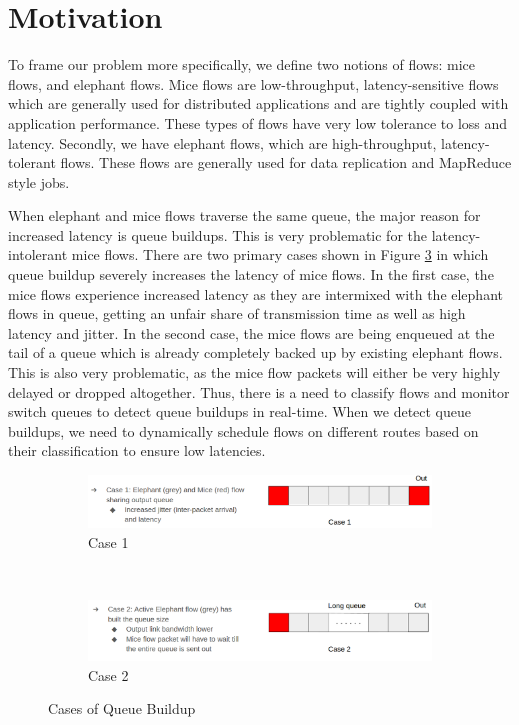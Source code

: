 \section{Motivation}
To frame our problem more specifically, we define two notions of flows: mice flows, and elephant flows. Mice flows are low-throughput, latency-sensitive flows which are generally used for distributed applications and are tightly coupled with application performance. These types of flows have very low tolerance to loss and latency. Secondly, we have elephant flows, which are high-throughput, latency-tolerant flows. These flows are generally used for data replication and MapReduce style jobs. 

When elephant and mice flows traverse the same queue, the major reason for increased latency is queue buildups. This is very problematic for the latency-intolerant mice flows. There are two primary cases shown in Figure \ref{fig:cases} in which queue buildup severely increases the latency of mice flows. In the first case, the mice flows experience increased latency as they are intermixed with the elephant flows in queue, getting an unfair share of transmission time as well as high latency and jitter. In the second case, the mice flows are being enqueued at the tail of a queue which is already completely backed up by existing elephant flows. This is also very problematic, as the mice flow packets will either be very highly delayed or dropped altogether. Thus, there is a need to classify flows and monitor switch queues to detect queue buildups in real-time. When we detect queue buildups, we need to dynamically schedule flows on different routes based on their classification to ensure low latencies. 

\begin{figure}[H]
\centering
\begin{subfigure}{.55\textwidth}
  \centering
  \includegraphics[width=.8\linewidth]{case1}
  \caption{Case 1}
  \label{fig:case1}
\end{subfigure}%
\\
\begin{subfigure}{.55\textwidth}
  \centering
  \includegraphics[width=.8\linewidth]{case2}
  \caption{Case 2 }
  \label{fig:case2}
\end{subfigure}
\caption{Cases of Queue Buildup}
\label{fig:cases}
\end{figure}

